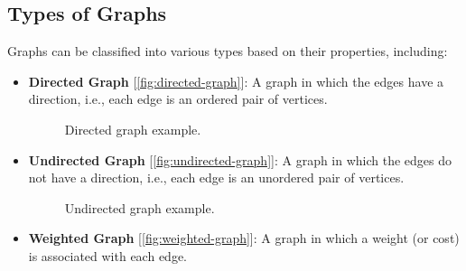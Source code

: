 \documentclass{article}
\begin{document}
\subsection{Types of Graphs}
Graphs can be classified into various types based on their properties, including:
\begin{itemize}
    \item \textbf{Directed Graph} [\autoref{fig:directed-graph}]: A graph in which the edges have a direction, i.e., each edge is an ordered pair of vertices.
    
    \begin{figure}[H]
    \centering
    \caption{Directed graph example.}
    \label{fig:directed-graph}
    \end{figure}

    \item \textbf{Undirected Graph} [\autoref{fig:undirected-graph}]: A graph in which the edges do not have a direction, i.e., each edge is an unordered pair of vertices.
    
    \begin{figure}[H]
    \centering
    \caption{Undirected graph example.}
    \label{fig:undirected-graph}
    \end{figure}
    
    \item \textbf{Weighted Graph} [\autoref{fig:weighted-graph}]: A graph in which a weight (or cost) is associated with each edge.
    
    \begin{figure}[H]
    \centering
\end{figure}
\end{itemize}
\end{document}
